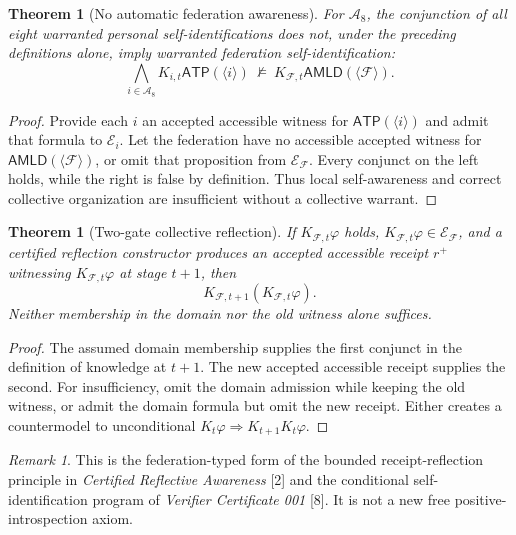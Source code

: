 \documentclass[10pt,letterpaper]{article}
\newtheorem{theorem}[definition]{Theorem}
\theoremstyle{remark}\newtheorem{remark}[definition]{Remark}
\newcommand{\AMLD}{\mathsf{AMLD}}
\newcommand{\ATP}{\mathsf{ATP}}
\newcommand{\F}{\mathcal{F}}
\newcommand{\Ag}{\mathcal{A}}
\newcommand{\E}{\mathcal{E}}
\begin{document}
\begin{theorem}[No automatic federation awareness]
For $\Ag_8$, the conjunction of all eight warranted personal self-identifications does not, under the preceding definitions alone, imply warranted federation self-identification:
\[
\bigwedge_{i\in\Ag_8}K_{i,t}\ATP(\langle i\rangle)\ \not\models\ K_{\F,t}\AMLD(\langle\F\rangle).
\]
\end{theorem}
\begin{proof}
Provide each $i$ an accepted accessible witness for $\ATP(\langle i\rangle)$ and admit that formula to $\E_i$. Let the federation have no accessible accepted witness for $\AMLD(\langle\F\rangle)$, or omit that proposition from $\E_{\F}$. Every conjunct on the left holds, while the right is false by definition. Thus local self-awareness and correct collective organization are insufficient without a collective warrant.
\end{proof}

\begin{theorem}[Two-gate collective reflection]
If $K_{\F,t}\varphi$ holds, $K_{\F,t}\varphi\in\E_{\F}$, and a certified reflection constructor produces an accepted accessible receipt $r^+$ witnessing $K_{\F,t}\varphi$ at stage $t+1$, then
\[
K_{\F,t+1}(K_{\F,t}\varphi).
\]
Neither membership in the domain nor the old witness alone suffices.
\end{theorem}
\begin{proof}
The assumed domain membership supplies the first conjunct in the definition of knowledge at $t+1$. The new accepted accessible receipt supplies the second. For insufficiency, omit the domain admission while keeping the old witness, or admit the domain formula but omit the new receipt. Either creates a countermodel to unconditional $K_t\varphi\Rightarrow K_{t+1}K_t\varphi$.
\end{proof}

\begin{remark}
This is the federation-typed form of the bounded receipt-reflection principle in \emph{Certified Reflective Awareness} [2] and the conditional self-identification program of \emph{Verifier Certificate 001} [8]. It is not a new free positive-introspection axiom.
\end{remark}
\end{document}

